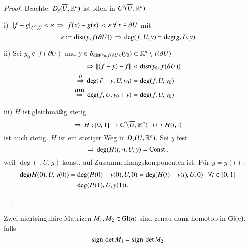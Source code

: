 \begin{proof}
    Beachte: $D_y(\overline U, \mathbb{R}^n)$ ist offen in $C^0(\overline U, \mathbb{R}^n)$
    \begin{description}
    \item{i)}
        $\|f-g\|_{C^0,\overline U} <\varepsilon \, \Rightarrow \, |f(x)-g(x)|<\varepsilon \, \forall \, x\in\partial U$ mit
        \[
            \varepsilon:= \mathrm{dist}(y,f(\partial U)) \, \Rightarrow \, \deg (f,U,y)=\deg (g,U,y)
        \]
    \item{ii)}
        Sei $y_0\nin f(\partial U)$ und $y\in B_{\mathrm{dist}(y_0,f(\partial U))}(y_0)\subset \mathbb{R}^n\setminus
                f(\partial U)$
        \begin{align*}
            \Rightarrow \, \|(f-y)-f\|&<\mathrm{dist}(y_0,f(\partial U))\\
                \overset{i)}{\Rightarrow} \, \deg(f-y,U,y_0) &= \deg(f,U,y_0)\\
            \overset{\textbf{(D1)}}{\Rightarrow } \, \deg (f,U,y_0+y)&= \deg(f,U,y_0)
        \end{align*}
    \item{iii)}
        $H$ ist gleichmäßig stetig
        \[
            \Rightarrow \, H:[0,1]\rightarrow C^0(\overline U,\mathbb{R}^n)\hspace{.25cm} t\mapsto H(t,\cdot)
        \]
        ist auch stetig. $H$ ist ein stetiger Weg in $D_y(\overline U,\mathbb{R}^n)$. Sei $y$ fest
        \[
            \Rightarrow \, \deg(H(t,\cdot),U,y)=\mathrm{Const} \,,
        \]
        weil $\deg(\cdot,U,y)$ konst. auf Zusammenhangskomponenten ist. Für $y=y(t):$
        \begin{align*}
            \deg(H(0),U,y(0))&=\deg(H(0)-y(0),U,0)=\deg(H(t)-y(t), U, 0) \hspace{.25cm} \forall t\in [0,1]\\
            &= \deg(H(1),U,y(1)).
        \end{align*}
    \end{description}
    \[ \]
\end{proof}

\begin{lem}\label{1.3.5}
    Zwei nichtsinguläre Matrizen $M_1,M_2\in \mathrm{Gl}(n)$ sind genau dann homotop in $\mathrm{Gl}(n)$, falls
    \[
        \mathrm{sign}\, \det M_1 = \mathrm{sign}\,\det M_2
    \]
\end{lem}

